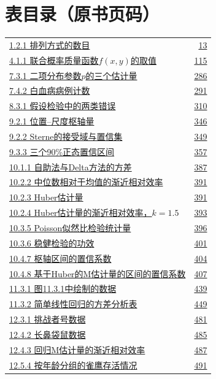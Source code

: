 \section*{表目录（原书页码）}\label{front:tables}
\begingroup\small
\begin{longtable}{@{}p{}r@{}}
\hyperref[tab:1.2.1]{1.2.1 排列方式的数目} & \hyperref[tab:1.2.1]{13} \\
\hyperref[tab:4.1.1]{4.1.1 联合概率质量函数$f(x,y)$的取值} & \hyperref[tab:4.1.1]{115} \\
\hyperref[tab:7.3.1]{7.3.1 二项分布参数$p$的三个估计量} & \hyperref[tab:7.3.1]{286} \\
\hyperref[tab:7.4.2]{7.4.2 白血病病例计数} & \hyperref[tab:7.4.2]{291} \\
\hyperref[tab:8.3.1]{8.3.1 假设检验中的两类错误} & \hyperref[tab:8.3.1]{310} \\
\hyperref[tab:9.2.1]{9.2.1 位置–尺度枢轴量} & \hyperref[tab:9.2.1]{346} \\
\hyperref[tab:9.2.2]{9.2.2 Sterne的接受域与置信集} & \hyperref[tab:9.2.2]{349} \\
\hyperref[tab:9.3.3]{9.3.3 三个90\%正态置信区间} & \hyperref[tab:9.3.3]{357} \\
\hyperref[tab:10.1.1]{10.1.1 自助法与Delta方法的方差} & \hyperref[tab:10.1.1]{387} \\
\hyperref[tab:10.2.2]{10.2.2 中位数相对于均值的渐近相对效率} & \hyperref[tab:10.2.2]{391} \\
\hyperref[tab:10.2.3]{10.2.3 Huber估计量} & \hyperref[tab:10.2.3]{391} \\
\hyperref[tab:10.2.4]{10.2.4 Huber估计量的渐近相对效率，$k=1.5$} & \hyperref[tab:10.2.4]{393} \\
\hyperref[tab:10.3.5]{10.3.5 Poisson似然比检验统计量} & \hyperref[tab:10.3.5]{396} \\
\hyperref[tab:10.3.6]{10.3.6 稳健检验的功效} & \hyperref[tab:10.3.6]{401} \\
\hyperref[tab:10.4.7]{10.4.7 枢轴区间的置信系数} & \hyperref[tab:10.4.7]{404} \\
\hyperref[tab:10.4.8]{10.4.8 基于Huber的M估计量的区间的置信系数} & \hyperref[tab:10.4.8]{407} \\
\hyperref[tab:11.3.1]{11.3.1 图11.3.1中绘制的数据} & \hyperref[tab:11.3.1]{439} \\
\hyperref[tab:11.3.2]{11.3.2 简单线性回归的方差分析表} & \hyperref[tab:11.3.2]{449} \\
\hyperref[tab:12.3.1]{12.3.1 挑战者号数据} & \hyperref[tab:12.3.1]{481} \\
\hyperref[tab:12.4.2]{12.4.2 长鼻袋鼠数据} & \hyperref[tab:12.4.2]{485} \\
\hyperref[tab:12.4.3]{12.4.3 回归M估计量的渐近相对效率} & \hyperref[tab:12.4.3]{487} \\
\hyperref[tab:12.5.4]{12.5.4 按年龄分组的雀鹰存活情况} & \hyperref[tab:12.5.4]{491} \\
\end{longtable}\endgroup
